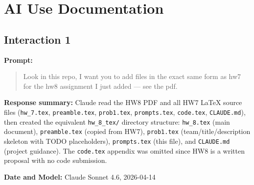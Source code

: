 
\section*{AI Use Documentation}

\subsection*{Interaction 1}

\textbf{Prompt:}
\begin{quote}
Look in this repo, I want you to add files in the exact same form as hw7 for the hw8 assignment I just added — see the pdf.
\end{quote}

\textbf{Response summary:}
Claude read the HW8 PDF and all HW7 \LaTeX{} source files (\texttt{hw\_7.tex}, \texttt{preamble.tex}, \texttt{prob1.tex}, \texttt{prompts.tex}, \texttt{code.tex}, \texttt{CLAUDE.md}), then created the equivalent \texttt{hw\_8\_tex/} directory structure: \texttt{hw\_8.tex} (main document), \texttt{preamble.tex} (copied from HW7), \texttt{prob1.tex} (team/title/description skeleton with TODO placeholders), \texttt{prompts.tex} (this file), and \texttt{CLAUDE.md} (project guidance). The \texttt{code.tex} appendix was omitted since HW8 is a written proposal with no code submission.

\textbf{Date and Model:} Claude Sonnet 4.6, 2026-04-14

